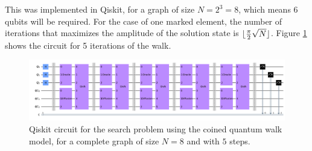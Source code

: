 \documentclass[../../dissertation.tex]{subfiles}
\begin{document}
This was implemented in Qiskit, for a graph of size $N=2^3=8$, which means $6$
qubits will be required. For the case of one marked element, the number of
iterations that maximizes the amplitude of the solution state is
$\lfloor\frac{\pi}{2} \sqrt{N}\rfloor$. Figure
\ref{fig:coinedQWSearchCircuitQistkit} shows the circuit for 5 iterations of
the walk.
\begin{figure}[!h]
	\centering
	\includegraphics[scale=0.21]{img/Qiskit/CoinedQuantumWalk/Search/Circuits/CoinedSearchQiskitCirc_N3_M0_S5.png}
	\caption{Qiskit circuit for the search problem using the coined quantum walk model, for a complete graph of size $N=8$ and with $5$ steps.} 
	\label{fig:coinedQWSearchCircuitQistkit}
\end{figure}\par
\end{document}
